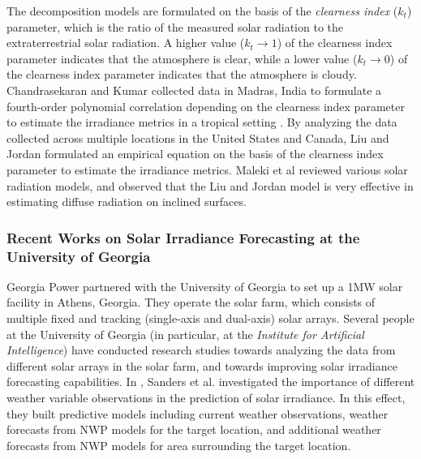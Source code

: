 \par The decomposition models are formulated on the basis of the \textit{clearness index} ($k_t$) parameter, which is the ratio of the measured solar radiation to the extraterrestrial solar radiation. A higher value ($k_t \rightarrow 1$) of the clearness index parameter indicates that the atmosphere is clear, while a lower value ($k_t \rightarrow 0$) of the clearness index parameter indicates that the atmosphere is cloudy. Chandrasekaran and Kumar \cite{litrev_pvlib5} collected data in Madras, India to formulate a fourth-order polynomial correlation depending on the clearness index parameter to estimate the irradiance metrics in a tropical setting \cite{litrev_pvlib6}. By analyzing the data collected across multiple locations in the United States and Canada, Liu and Jordan \cite{litrev_pvlib7} formulated an empirical equation on the basis of the clearness index parameter to estimate the irradiance metrics. Maleki et al \cite{litrev_pvlib3} reviewed various solar radiation models, and observed that the Liu and Jordan model is very effective in estimating diffuse radiation on inclined surfaces.

\subsubsection*{Recent Works on Solar Irradiance Forecasting at the University of Georgia}
\par Georgia Power partnered with the University of Georgia to set up a 1MW solar facility in Athens, Georgia. They operate the solar farm, which consists of multiple fixed and tracking (single-axis and dual-axis) solar arrays. Several people at the University of Georgia (in particular, at the \textit{Institute for Artificial Intelligence}) have conducted research studies towards analyzing the data from different solar arrays in the solar farm, and towards improving solar irradiance forecasting capabilities. In \cite{publication_sanders}, Sanders et al. investigated the importance of different weather variable observations in the prediction of solar irradiance. In this effect, they built predictive models including current weather observations, weather forecasts from NWP models for the target location, and additional weather forecasts from NWP models for area surrounding the target location. 

